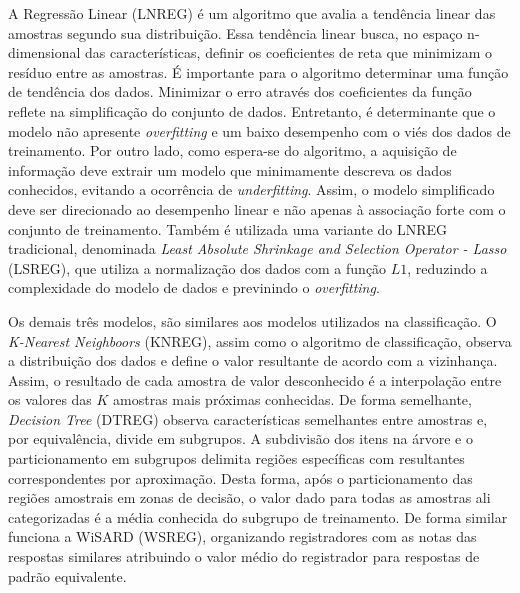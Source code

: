 A Regressão Linear (LNREG) é um algoritmo que avalia a tendência linear das amostras segundo sua distribuição. Essa tendência linear busca, no espaço n-dimensional das características, definir os coeficientes de reta que minimizam o resíduo entre as amostras. É importante para o algoritmo determinar uma função de tendência dos dados. Minimizar o erro através dos coeficientes da função reflete na simplificação do conjunto de dados. Entretanto, é determinante que o modelo não apresente \textit{overfitting} e um baixo desempenho com o viés dos dados de treinamento. Por outro lado, como espera-se do algoritmo, a aquisição de informação deve extrair um modelo que minimamente descreva os dados conhecidos, evitando a ocorrência de \textit{underfitting}. Assim, o modelo simplificado deve ser direcionado ao desempenho linear e não apenas à associação forte com o conjunto de treinamento. Também é utilizada uma variante do LNREG tradicional, denominada \textit{Least Absolute Shrinkage and Selection Operator - Lasso} (LSREG), que utiliza a normalização dos dados com a função $ L1 $, reduzindo a complexidade do modelo de dados e previnindo o \textit{overfitting}.

Os demais três modelos, são similares aos modelos utilizados na classificação. O \textit{K-Nearest Neighboors} (KNREG), assim como o algoritmo de classificação, observa a distribuição dos dados e define o valor resultante de acordo com a vizinhança. Assim, o resultado de cada amostra de valor desconhecido é a interpolação entre os valores das $ K $ amostras mais próximas conhecidas. De forma semelhante, \textit{Decision Tree} (DTREG) observa características semelhantes entre amostras e, por equivalência, divide em subgrupos. A subdivisão dos itens na árvore e o particionamento em subgrupos delimita regiões específicas com resultantes correspondentes por aproximação. Desta forma, após o particionamento das regiões amostrais em zonas de decisão, o valor dado para todas as amostras ali categorizadas é a média conhecida do subgrupo de treinamento. De forma similar funciona a WiSARD (WSREG), organizando registradores com as notas das respostas similares atribuindo o valor médio do registrador para respostas de padrão equivalente.

